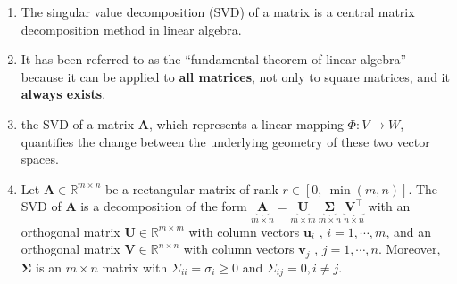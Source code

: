\begin{enumerate}
    \item The singular value decomposition (SVD) of a matrix is a central matrix decomposition method in linear algebra.
    \hfill \cite{mfml/book/mml/Deisenroth-Faisal-Ong}

    \item It has been referred to as the “fundamental theorem of linear algebra” because it can be applied to \textbf{all matrices}, not only to square matrices, and it \textbf{always exists}.
    \hfill \cite{mfml/book/mml/Deisenroth-Faisal-Ong}

    \item the SVD of a matrix $\bm{A}$, which represents a linear mapping $\Phi : V \to W$, quantifies the change between the underlying geometry of these two vector spaces.
    \hfill \cite{mfml/book/mml/Deisenroth-Faisal-Ong}

    \item 
    \begin{theorem}
        Let $\bm{A} \in \mathbb{R}^{m\times n}$ be a rectangular matrix of rank $r \in [0,\ \min(m, n)]$. 
        The SVD of $\bm{A}$ is a decomposition of the form 
        $
            \underset{\displaystyle m\times n}{\underbrace{\bm{A}}} = 
            \underset{\displaystyle m\times m}{\underbrace{\bm{U}}}\ 
            \underset{\displaystyle m\times n}{\underbrace{\bm{\Sigma}}}\ 
            \underset{\displaystyle n\times n}{\underbrace{\bm{V}^\top}}
        $ 
        with an orthogonal matrix $\bm{U} \in \mathbb{R}^{m\times m}$ with column vectors $\bm{u}_i$ , $i = 1, \cdots , m$, and an orthogonal matrix $\bm{V} \in \mathbb{R}^{n\times n}$ with column vectors $\bm{v}_j$ , $j = 1, \cdots , n$.
        Moreover, $\bm{\Sigma}$ is an $m \times n$ matrix with $\Sigma_{ii} = \sigma_i \geq 0$ and $\Sigma_{ij} = 0, i \neq j$.
        \hfill \cite{mfml/book/mml/Deisenroth-Faisal-Ong}
    \end{theorem}
\end{enumerate}










